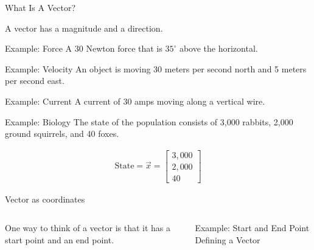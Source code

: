 \documentclass[svgnames,table,,aspectratio=169]{beamer}
\newcommand{\columnVector}[1]{%
  \left[
    \begin{array}{r}
    #1                           
    \end{array}
  \right]
}
\begin{document}
\begin{frame}{What Is A Vector?}

  A vector has a magnitude and a direction.

   {
    \begin{block}{Example: Force}
      A 30 Newton force that is $35^\circ$ above the horizontal.
    \end{block}
  }

   {
    \begin{block}{Example: Velocity}
      An object is moving 30 meters per second north and 5 meters per
      second east.
    \end{block}
  }

   {
    \begin{block}{Example: Current}
      A current of 30 amps moving along a vertical wire.
    \end{block}
  }

   {
    \begin{block}{Example: Biology}
      The state of the population consists of 3,000 rabbits, 2,000
      ground squirrels, and  40 foxes.

      \begin{eqnarray*}
        \mathrm{State}  =  \vec{x}  =  \columnVector{3,000 \\ 2,000 \\ 40}
      \end{eqnarray*}
    \end{block}
  }


\end{frame}


\begin{frame}{Vector as coordinates}

  \begin{columns}
    One way to think of a vector is that it has a start point and an
    end point.


    Example: Start and End Point Defining a Vector

  \end{columns}
\end{frame}
\end{document}
